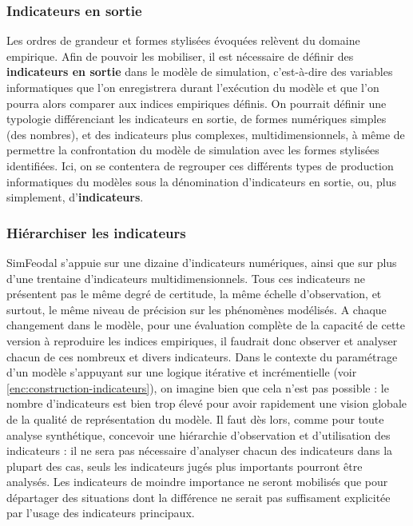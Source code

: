 \documentclass[12pt, a4paper, oneside]{book}
\begin{document}
	\subsubsection{Indicateurs en sortie}
	Les ordres de grandeur et formes stylisées évoquées relèvent du domaine empirique. Afin de pouvoir les mobiliser, il est nécessaire de définir des \textbf{indicateurs en sortie} dans le modèle de simulation, c'est-à-dire des variables informatiques que l'on enregistrera durant l'exécution du modèle et que l'on pourra alors comparer aux indices empiriques définis. On pourrait définir une typologie différenciant les indicateurs en sortie, de formes numériques simples (des nombres), et des indicateurs plus complexes, multidimensionnels, à même de permettre la confrontation du modèle de simulation avec les formes stylisées identifiées. Ici, on se contentera de regrouper ces différents types de production informatiques du modèles sous la dénomination d'\og indicateurs en sortie\fg{}, ou, plus simplement, d'\textbf{indicateurs}.
	
	
	\subsubsection{Hiérarchiser les indicateurs}
	SimFeodal s'appuie sur une dizaine d'indicateurs numériques, ainsi que sur plus d'une trentaine d'indicateurs multidimensionnels. Tous ces indicateurs ne présentent pas le même degré de certitude, la même échelle d'observation, et surtout, le même niveau de précision sur les phénomènes modélisés. A chaque changement dans le modèle, pour une évaluation complète de la capacité de cette version à reproduire les indices empiriques, il faudrait donc observer et analyser chacun de ces nombreux et divers indicateurs. Dans le contexte du paramétrage d'un modèle s'appuyant sur une logique itérative et incrémentielle (voir \cref{enc:construction-indicateurs}), on imagine bien que cela n'est pas possible : le nombre d'indicateurs est bien trop élevé pour avoir rapidement une vision globale de la qualité de représentation du modèle. Il faut dès lors, comme pour toute analyse synthétique, concevoir une hiérarchie d'observation et d'utilisation des indicateurs : il ne sera pas nécessaire d'analyser chacun des indicateurs dans la plupart des cas, seuls les indicateurs jugés plus importants pourront être analysés. Les indicateurs de moindre importance ne seront mobilisés que pour départager des situations dont la différence ne serait pas suffisament explicitée par l'usage des indicateurs principaux.
	
\end{document}

